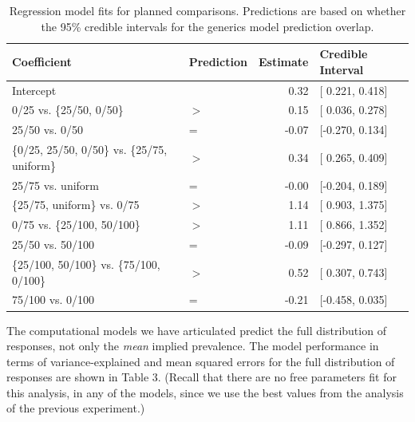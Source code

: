\documentclass[floatsintext,doc]{apa6}
\begin{document}
\begin{table}[h]
\centering
\begingroup\fontsize{10pt}{11pt}\selectfont
\begin{tabular}{llrl}
  \hline
Coefficient & Prediction & Estimate & Credible Interval \\ 
  \hline
Intercept &  & 0.32 & [ 0.221, 0.418] \\ 
  0/25 vs. \{25/50, 0/50\} & $>$ & 0.15 & [ 0.036, 0.278] \\ 
  25/50 vs. 0/50 & = & -0.07 & [-0.270, 0.134] \\ 
  \{0/25, 25/50, 0/50\} vs. \{25/75, uniform\} & $>$ & 0.34 & [ 0.265, 0.409] \\ 
  25/75 vs. uniform & = & -0.00 & [-0.204, 0.189] \\ 
  \{25/75, uniform\} vs. 0/75 & $>$ & 1.14 & [ 0.903, 1.375] \\ 
  0/75 vs. \{25/100, 50/100\} & $>$ & 1.11 & [ 0.866, 1.352] \\ 
  25/50 vs. 50/100 & = & -0.09 & [-0.297, 0.127] \\ 
  \{25/100, 50/100\} vs. \{75/100, 0/100\} & $>$ & 0.52 & [ 0.307, 0.743] \\ 
  75/100 vs. 0/100 & = & -0.21 & [-0.458, 0.035] \\ 
   \hline
\end{tabular}
\endgroup
\caption{Regression model fits for planned comparisons. Predictions are based on whether the 95\% credible intervals for the generics model prediction overlap.} 
\end{table}

The computational models we have articulated  predict the full distribution of responses, not only the \emph{mean} implied prevalence.
The model performance in terms of variance-explained and mean squared errors for the full distribution of responses are shown in Table 3.
(Recall that there are no free parameters fit for this analysis, in any of the models, since we use the best values from the analysis of the previous experiment.)
\end{document}
